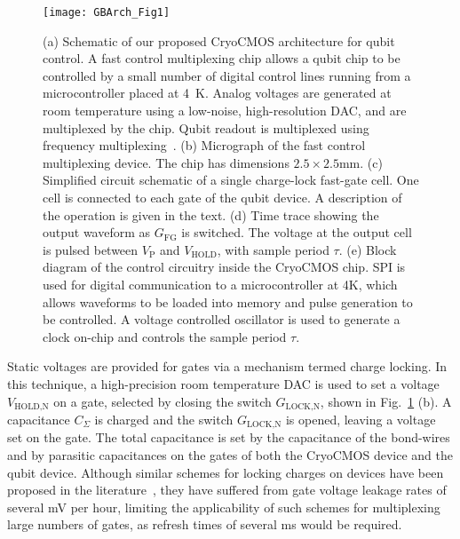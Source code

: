 \begin{figure}
  \texttt{[image: GBArch\_Fig1]}
  \caption[Schematic of our proposed CryoCMOS architecture]
  {\label{fig:gbarch}(a) Schematic of our proposed CryoCMOS architecture for qubit control. A fast control multiplexing chip allows a qubit chip to be controlled by a small number of digital control lines running from a microcontroller placed at \SI{4}{\kelvin}. Analog voltages are generated at room temperature using a low-noise, high-resolution DAC, and are multiplexed by the chip. Qubit readout is multiplexed using frequency multiplexing~\cite{doi:10.1063/1.4868107}. (b) Micrograph of the fast control multiplexing device. The chip has dimensions $2.5\times2.5\si{\milli\meter}$. (c) Simplified circuit schematic of a single charge-lock fast-gate cell. One cell is connected to each gate of the qubit device. A description of the operation is given in the text. (d) Time trace showing the output waveform as $G_\textrm{FG}$ is switched. The voltage at the output cell is pulsed between $V_\textrm{P}$ and $V_\textrm{HOLD}$, with sample period $\tau$. (e) Block diagram of the control circuitry inside the CryoCMOS chip.  SPI is used for digital communication to a microcontroller at 4K, which allows waveforms to be loaded into memory and pulse generation to be controlled. A voltage controlled oscillator is used to generate a clock on-chip and controls the sample period $\tau$.}
\end{figure}

Static voltages are provided for gates via a mechanism termed charge locking. In this technique, a high-precision room temperature DAC is used to set a voltage $V_\textrm{HOLD,N}$ on a
gate, selected by closing the switch $G_\textrm{LOCK,N}$, shown in Fig.~\ref{fig:gbarch} (b). A capacitance $C_\Sigma$ is charged and the switch $G_\textrm{LOCK,N}$ is opened, leaving a voltage set on the gate. The total capacitance is set by the capacitance of the bond-wires and by parasitic capacitances on the gates of both the CryoCMOS device and the qubit device. Although similar schemes for locking charges on devices have been proposed in the literature~\cite{PhysRevApplied.9.054016,doi:10.1063/1.4932012}, they have suffered from gate voltage leakage rates of several mV per hour, limiting the applicability of such schemes for multiplexing large numbers of gates, as refresh times of several ms would be required.

